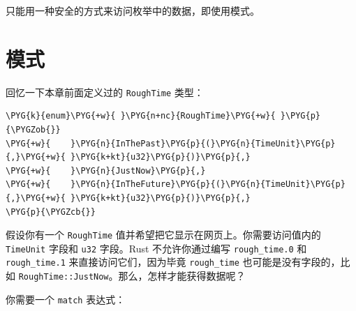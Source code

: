 只能用一种安全的方式来访问枚举中的数据，即使用模式。

\section{模式}

回忆一下本章前面定义过的 \texttt{RoughTime} 类型：

\begin{Verbatim}[commandchars=\\\{\},breaklines=true,breakanywhere=true,fontsize=\codefont,xleftmargin=17bp]
\PYG{k}{enum}\PYG{+w}{ }\PYG{n+nc}{RoughTime}\PYG{+w}{ }\PYG{p}{\PYGZob{}}
\PYG{+w}{    }\PYG{n}{InThePast}\PYG{p}{(}\PYG{n}{TimeUnit}\PYG{p}{,}\PYG{+w}{ }\PYG{k+kt}{u32}\PYG{p}{)}\PYG{p}{,}
\PYG{+w}{    }\PYG{n}{JustNow}\PYG{p}{,}
\PYG{+w}{    }\PYG{n}{InTheFuture}\PYG{p}{(}\PYG{n}{TimeUnit}\PYG{p}{,}\PYG{+w}{ }\PYG{k+kt}{u32}\PYG{p}{)}\PYG{p}{,}
\PYG{p}{\PYGZcb{}}
\end{Verbatim}

假设你有一个 \texttt{RoughTime} 值并希望把它显示在网页上。你需要访问值内的 \texttt{TimeUnit} 字段和 \texttt{u32} 字段。Rust 不允许你通过编写 \texttt{rough\_time.0} 和 \texttt{rough\_time.1} 来直接访问它们，因为毕竟 \texttt{rough\_time} 也可能是没有字段的，比如 \texttt{RoughTime::JustNow}。那么，怎样才能获得数据呢？

你需要一个 \texttt{match} 表达式：

